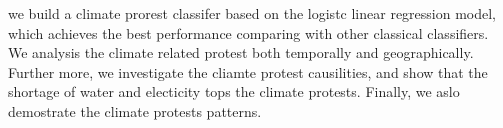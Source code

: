 we build a climate prorest classifer based on the logistc linear regression model, which achieves the best performance comparing with other classical classifiers. We analysis the climate related protest both temporally and geographically. Further more, we investigate the cliamte protest causilities, and show that the shortage of water and electicity tops the climate protests. Finally, we aslo demostrate the climate protests patterns.   
